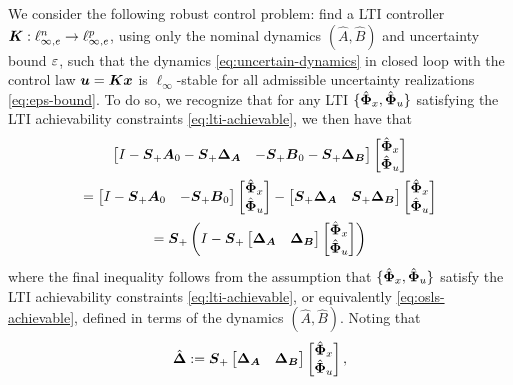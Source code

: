 We consider the following robust control problem: find a LTI controller $\tf K : \ell^n_{\infty,e} \to \ell^p_{\infty,e}$, using only the nominal dynamics $(\hat A,\hat B)$ and uncertainty bound $\eps$, such that the dynamics \eqref{eq:uncertain-dynamics} in closed loop with the control law $\uu = \K \x$ is $\ell_\infty$-stable for all admissible uncertainty realizations \eqref{eq:eps-bound}.  To do so, we recognize that for any LTI $\{\Phixh,\Phiuh\}$ satisfying the LTI achievability constraints \eqref{eq:lti-achievable}, we then have that
\begin{multline}
\begin{bmatrix} I - \Sp\A_0 - \Sp\DA & - \Sp\B_0 - \Sp\DB \end{bmatrix}\begin{bmatrix} \Phixh \\ \Phiuh \end{bmatrix} \\= \begin{bmatrix} I - \Sp\A_0 & - \Sp\B_0 \end{bmatrix}\begin{bmatrix} \Phixh \\ \Phiuh \end{bmatrix} - \begin{bmatrix} \Sp\DA & \Sp\DB \end{bmatrix}\begin{bmatrix} \Phixh \\ \Phiuh \end{bmatrix}\\ = \Sp\left(I - \Sp\begin{bmatrix} \DA & \DB \end{bmatrix}\begin{bmatrix} \Phixh \\ \Phiuh \end{bmatrix} \right)
\end{multline}
where the final inequality follows from the assumption that $\{\Phixh,\Phiuh\}$ satisfy the LTI achievability constraints \eqref{eq:lti-achievable}, or equivalently \eqref{eq:osls-achievable}, defined in terms of the dynamics $(\hat A, \hat B)$.  Noting that
\begin{equation}
\Dh := \Sp\begin{bmatrix} \DA & \DB \end{bmatrix}\begin{bmatrix} \Phixh \\ \Phiuh \end{bmatrix},
\end{equation}
